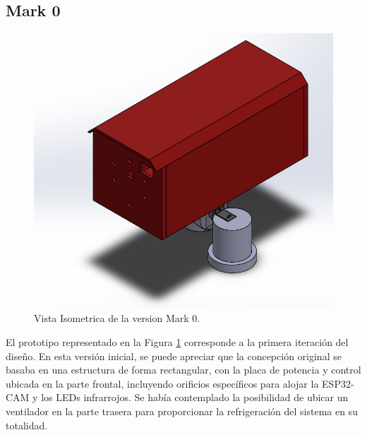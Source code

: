 \needspace{3cm}
\subsection{Mark 0}

    \begin{figure}[H]
    \centering
    \begin{adjustbox}{width=\linewidth/2}
      \includegraphics{media/Mark__00.png}
    \end{adjustbox}
    \caption{\label{fig:isometrico_Mark00}Vista Isometrica de la version Mark 0.}
    \end{figure}
    El prototipo representado en la Figura \ref{fig:isometrico_Mark00} corresponde a la primera iteración del diseño. En esta versión inicial, se puede apreciar que la concepción original se basaba en una estructura de forma rectangular, con la placa de potencia y control ubicada en la parte frontal, incluyendo orificios específicos para alojar la ESP32-CAM y los LEDs infrarrojos. Se había contemplado la posibilidad de ubicar un ventilador en la parte trasera para proporcionar la refrigeración del sistema en su totalidad.
